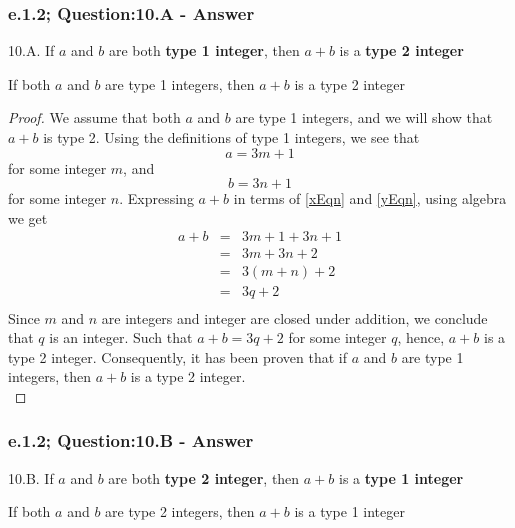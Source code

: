 \subsubsection*{e.1.2; Question:10.A - Answer}
10.A. If $a$ and $b$ are both {\bf type 1 integer}, then $a+b$ is a {\bf type 2 integer} \\

\begin{tcolorbox}
\begin{theorem}
If both $a$ and $b$ are type 1 integers, then $a + b$ is a type 2 integer
\end{theorem}
\end{tcolorbox}

\begin{proof}
We assume that both $a$ and $b$ are type 1 integers, and we will show that $a + b$ is type 2. Using the definitions of type 1 integers, we see that
\begin{equation}
\label{xEqn}
a = 3m + 1
\end{equation}
for some integer $m$, and
\begin{equation}
\label{yEqn}
b = 3n + 1
\end{equation}
for some integer $n$. Expressing $a + b$ in terms of \ref{xEqn} and \ref{yEqn}, using algebra we get
\begin{eqnarray*}
a + b & = & 3m + 1 + 3n + 1  \nonumber \\
& = & 3m + 3n + 2 \nonumber \\
& = & 3(m + n) + 2 \nonumber \\
& = & 3q + 2 \nonumber \\
\end{eqnarray*}
Since $m$ and $n$ are integers and integer are closed under addition, we conclude that $q$ is an integer. Such that $a + b = 3q + 2$ for some integer $q$, hence, $a + b$ is a type 2 integer. Consequently, it has been proven that if $a$ and $b$ are type 1 integers, then $a + b$ is a type 2 integer. \\
\end{proof}


\subsubsection*{e.1.2; Question:10.B - Answer}
10.B. If $a$ and $b$ are both {\bf type 2 integer}, then $a+b$ is a {\bf type 1 integer} \\

\begin{tcolorbox}
\begin{theorem}
If both $a$ and $b$ are type 2 integers, then $a + b$ is a type 1 integer
\end{theorem}
\end{tcolorbox}


